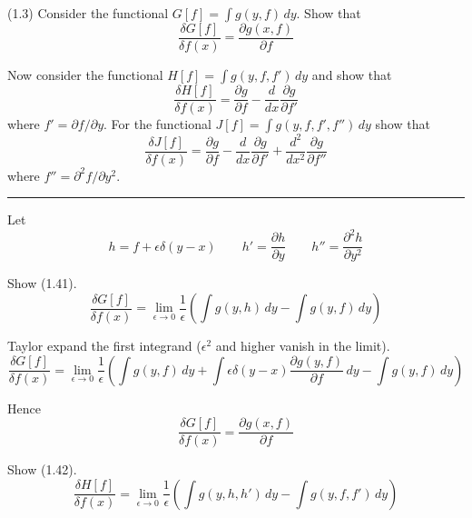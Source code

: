 \documentclass[12pt]{article}
\begin{document}
(1.3)
Consider the functional $G[f]=\int g(y,f)\,dy$.
Show that
\begin{equation*}
\frac{\delta G[f]}{\delta f(x)}=\frac{\partial g(x,f)}{\partial f}
\tag{1.41}
\end{equation*}

Now consider the functional $H[f]=\int g(y,f,f')\,dy$
and show that
\begin{equation*}
\frac{\delta H[f]}{\delta f(x)}=\frac{\partial g}{\partial f}
-\frac{d}{dx}\frac{\partial g}{\partial f'}
\tag{1.42}
\end{equation*}
where $f'=\partial f/\partial y$.
For the functional $J[f]=\int g(y,f,f',f'')\,dy$ show that
\begin{equation*}
\frac{\delta J[f]}{\delta f(x)}
=\frac{\partial g}{\partial f}
-\frac{d}{dx}\frac{\partial g}{\partial f'}
+\frac{d^2}{dx^2}\frac{\partial g}{\partial f''}
\tag{1.43}
\end{equation*}
where $f''=\partial^2 f/\partial y^2$.

\bigskip
\hrule

\bigskip
Let
\begin{equation*}
h=f+\epsilon\delta(y-x)
\qquad
h'=\frac{\partial h}{\partial y}
\qquad
h''=\frac{\partial^2 h}{\partial y^2}
\end{equation*}

Show (1.41).
\begin{equation*}
\frac{\delta G[f]}{\delta f(x)}
=\lim_{\epsilon\rightarrow 0}\frac{1}{\epsilon}
\left(
\int g(y,h)\,dy-\int g(y,f)\,dy
\right)
\end{equation*}

Taylor expand the first integrand ($\epsilon^2$ and higher vanish in the limit).
\begin{equation*}
\frac{\delta G[f]}{\delta f(x)}
=\lim_{\epsilon\rightarrow 0}\frac{1}{\epsilon}
\left(
\int g(y,f)\,dy
+\int\epsilon\delta(y-x)\frac{\partial g(y,f)}{\partial f}\,dy
-\int g(y,f)\,dy
\right)
\end{equation*}

Hence
\begin{equation*}
\frac{\delta G[f]}{\delta f(x)}=\frac{\partial g(x,f)}{\partial f}
\end{equation*}

Show (1.42).
\begin{equation*}
\frac{\delta H[f]}{\delta f(x)}
=\lim_{\epsilon\rightarrow 0}\frac{1}{\epsilon}
\left(
\int g(y,h,h')\,dy-\int g(y,f,f')\,dy
\right)
\end{equation*}
\end{document}
